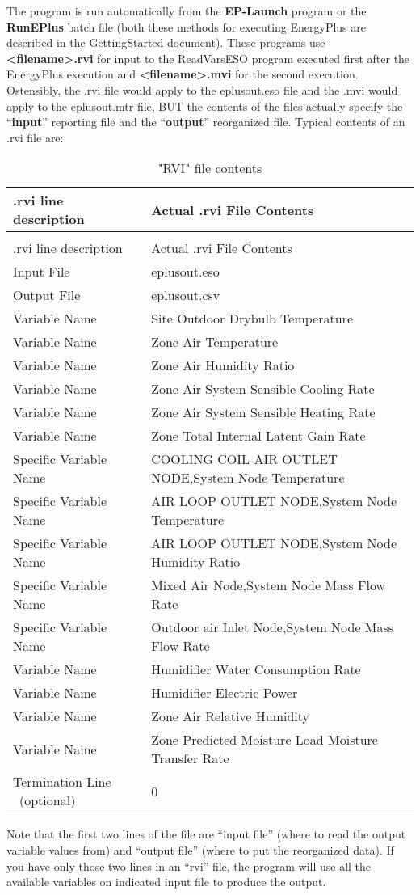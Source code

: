 The program is run automatically from the \textbf{EP-Launch} program or the \textbf{RunEPlus} batch file (both these methods for executing EnergyPlus are described in the GettingStarted document). These programs use \textbf{\textless{}filename\textgreater{}.rvi} for input to the ReadVarsESO program executed first after the EnergyPlus execution and \textbf{\textless{}filename\textgreater{}.mvi} for the second execution. Ostensibly, the .rvi file would apply to the eplusout.eso file and the .mvi would apply to the eplusout.mtr file, BUT the contents of the files actually specify the ``\textbf{input}'' reporting file and the ``\textbf{output}'' reorganized file. Typical contents of an .rvi file are:

\begin{longtable}[c]{p{2.1in}p{3.9in}}
\caption{"RVI" file contents \label{table:rvi-file-contents}} \tabularnewline
\toprule 
.rvi line description & Actual .rvi File Contents \tabularnewline
\midrule
\endfirsthead

\caption[]{"RVI" file contents} \tabularnewline
\toprule 
.rvi line description & Actual .rvi File Contents \tabularnewline
\midrule
\endhead

Input File & eplusout.eso \tabularnewline
Output File & eplusout.csv \tabularnewline
Variable Name & Site Outdoor Drybulb Temperature \tabularnewline
Variable Name & Zone Air Temperature \tabularnewline
Variable Name & Zone Air Humidity Ratio \tabularnewline
Variable Name & Zone Air System Sensible Cooling Rate \tabularnewline
Variable Name & Zone Air System Sensible Heating Rate \tabularnewline
Variable Name & Zone Total Internal Latent Gain Rate \tabularnewline
Specific Variable Name & COOLING COIL AIR OUTLET NODE,System Node Temperature \tabularnewline
Specific Variable Name & AIR LOOP OUTLET NODE,System Node Temperature \tabularnewline
Specific Variable Name & AIR LOOP OUTLET NODE,System Node Humidity Ratio \tabularnewline
Specific Variable Name & Mixed Air Node,System Node Mass Flow Rate \tabularnewline
Specific Variable Name & Outdoor air Inlet Node,System Node Mass Flow Rate \tabularnewline
Variable Name & Humidifier Water Consumption Rate \tabularnewline
Variable Name & Humidifier Electric Power \tabularnewline
Variable Name & Zone Air Relative Humidity \tabularnewline
Variable Name & Zone Predicted Moisture Load Moisture Transfer Rate \tabularnewline
Termination Line ~(optional) & 0 \tabularnewline
\bottomrule
\end{longtable}

Note that the first two lines of the file are ``input file'' (where to read the output variable values from) and ``output file'' (where to put the reorganized data). If you have only those two lines in an ``rvi'' file, the program will use all the available variables on indicated input file to produce the output.


